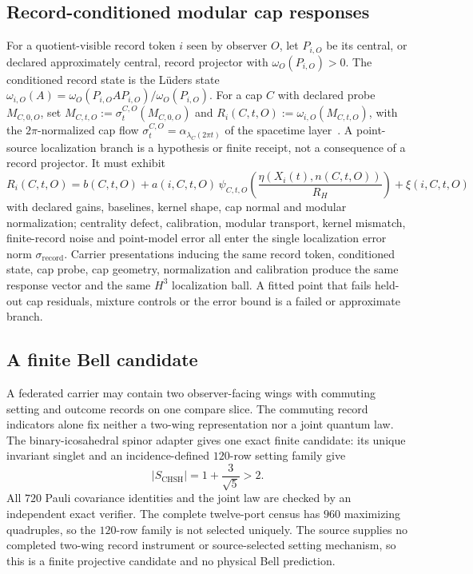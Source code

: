 \documentclass[11pt]{article}
\theoremstyle{remark}
\theoremstyle{plain}
\begin{document}
\subsection{Record-conditioned modular cap responses}\label{subsec:record-conditioned-modular-cap-responses}

For a quotient-visible record token \(i\) seen by observer \(O\), let
\(P_{i,O}\) be its central, or declared approximately central, record
projector with \(\omega_O(P_{i,O})>0\). The conditioned record state is the
L\"uders state
\(\omega_{i,O}(A)=\omega_O(P_{i,O}AP_{i,O})/\omega_O(P_{i,O})\). For a cap
\(C\) with declared probe \(M_{C,0,O}\), set
\(M_{C,t,O}:=\sigma_t^{C,O}(M_{C,0,O})\) and
\(R_i(C,t,O):=\omega_{i,O}(M_{C,t,O})\), with the \(2\pi\)-normalized cap
flow \(\sigma_t^{C,O}=\alpha_{\lambda_C(2\pi t)}\) of the spacetime
layer~\cite{ophEinstein}. A point-source localization branch is a hypothesis
or finite receipt, not a consequence of a record projector. It must exhibit
\[
R_i(C,t,O)
=
b(C,t,O)
+a(i,C,t,O)\,
\psi_{C,t,O}\!\left(\frac{\eta(X_i(t),n(C,t,O))}{R_H}\right)
+\xi(i,C,t,O)
\]
with declared gains, baselines, kernel shape, cap normal and modular
normalization; centrality defect, calibration, modular transport, kernel
mismatch, finite-record noise and point-model error all enter the single
localization error norm \(\sigma_{\mathrm{record}}\). Carrier presentations
inducing the same record token, conditioned state, cap probe, cap geometry,
normalization and calibration produce the same response vector and the same
\(H^3\) localization ball. A fitted point that fails held-out cap residuals,
mixture controls or the error bound is a failed or approximate branch.

\subsection{A finite Bell candidate}
A federated carrier may contain two observer-facing wings with commuting
setting and outcome records on one compare slice. The commuting record
indicators alone fix neither a two-wing representation nor a joint quantum
law. The binary-icosahedral spinor adapter gives one exact finite candidate:
its unique invariant singlet and an incidence-defined \(120\)-row setting
family give
\[
\lvert S_{\mathrm{CHSH}}\rvert=1+\frac{3}{\sqrt5}>2.
\]
All \(720\) Pauli covariance identities and the joint law are checked by an
independent exact verifier. The complete twelve-port census has \(960\)
maximizing quadruples, so the \(120\)-row family is not selected uniquely.
The source supplies no completed two-wing record instrument or
source-selected setting mechanism, so this is a finite projective candidate
and no physical Bell prediction.
\end{document}
